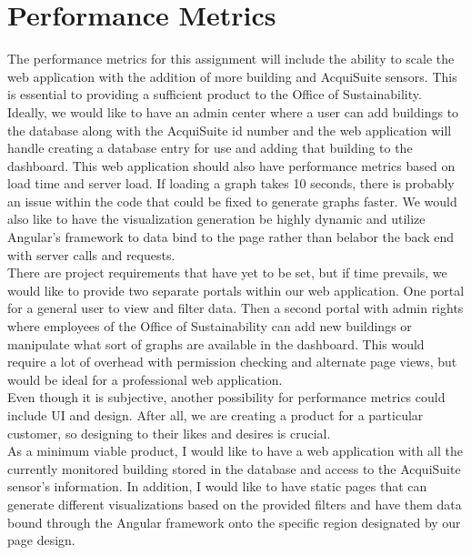 \documentclass[onecolumn, draftclsnofoot,10pt, compsoc]{IEEEtran}
\begin{document}
  \section{Performance Metrics}
  The performance metrics for this assignment will include the ability to scale the web application with the addition of more building and AcquiSuite sensors. This is essential to providing a sufficient product to the Office of Sustainability. Ideally, we would like to have an admin center where a user can add buildings to the database along with the AcquiSuite id number and the web application will handle creating a database entry for use and adding that building to the dashboard. This web application should also have performance metrics based on load time and server load. If loading a graph takes 10 seconds, there is probably an issue within the code that could be fixed to generate graphs faster. We would also like to have the visualization generation be highly dynamic and utilize Angular's framework to data bind to the page rather than belabor the back end with server calls and requests.\\ 
  \indent There are project requirements that have yet to be set, but if time prevails, we would like to provide two separate portals within our web application. One portal for a general user to view and filter data. Then a second portal with admin rights where employees of the Office of Sustainability can add new buildings or manipulate what sort of graphs are available in the dashboard. This would require a lot of overhead with permission checking and alternate page views, but would be ideal for a professional web application.\\
  \indent Even though it is subjective, another possibility for performance metrics could include UI and design. After all, we are creating a product for a particular customer, so designing to their likes and desires is crucial.\\ 
  \indent As a minimum viable product, I would like to have a web application with all the currently monitored building stored in the database and access to the AcquiSuite sensor's information. In addition, I would like to have static pages that can generate different visualizations based on the provided filters and have them data bound through the Angular framework onto the specific region designated by our page design.
  
  
  
\end{document}
